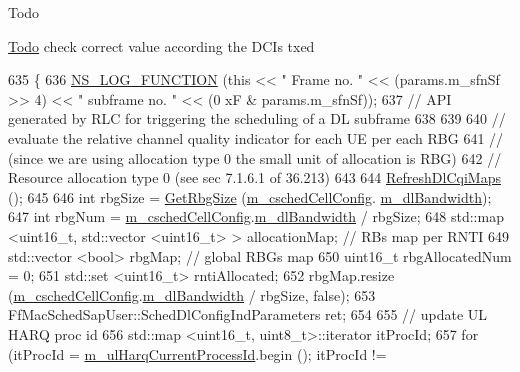 \begin{DoxyRefDesc}{Todo}
\item[\hyperlink{todo__todo000138}{Todo}]check correct value according the D\+C\+Is txed \end{DoxyRefDesc}

\begin{DoxyCode}
635 \{
636   \hyperlink{log-macros-disabled_8h_a90b90d5bad1f39cb1b64923ea94c0761}{NS\_LOG\_FUNCTION} (\textcolor{keyword}{this} << \textcolor{stringliteral}{" Frame no. "} << (params.m\_sfnSf >> 4) << \textcolor{stringliteral}{" subframe no. "} << (0
      xF & params.m\_sfnSf));
637   \textcolor{comment}{// API generated by RLC for triggering the scheduling of a DL subframe}
638 
639 
640   \textcolor{comment}{// evaluate the relative channel quality indicator for each UE per each RBG}
641   \textcolor{comment}{// (since we are using allocation type 0 the small unit of allocation is RBG)}
642   \textcolor{comment}{// Resource allocation type 0 (see sec 7.1.6.1 of 36.213)}
643 
644   \hyperlink{classns3_1_1TtaFfMacScheduler_a26eadc05cfa6ac456b5149467f0b92ec}{RefreshDlCqiMaps} ();
645 
646   \textcolor{keywordtype}{int} rbgSize = \hyperlink{classns3_1_1TtaFfMacScheduler_a496f93bd1b87f83996ba8358903ab69d}{GetRbgSize} (\hyperlink{classns3_1_1TtaFfMacScheduler_af263a06ea69ff1d096ddb48df0ac7f81}{m\_cschedCellConfig}.
      \hyperlink{structns3_1_1FfMacCschedSapProvider_1_1CschedCellConfigReqParameters_ad18c695bd3c9d7f742ba1dab4a941e8a}{m\_dlBandwidth});
647   \textcolor{keywordtype}{int} rbgNum = \hyperlink{classns3_1_1TtaFfMacScheduler_af263a06ea69ff1d096ddb48df0ac7f81}{m\_cschedCellConfig}.\hyperlink{structns3_1_1FfMacCschedSapProvider_1_1CschedCellConfigReqParameters_ad18c695bd3c9d7f742ba1dab4a941e8a}{m\_dlBandwidth} / rbgSize;
648   std::map <uint16\_t, std::vector <uint16\_t> > allocationMap; \textcolor{comment}{// RBs map per RNTI}
649   std::vector <bool> rbgMap;  \textcolor{comment}{// global RBGs map}
650   uint16\_t rbgAllocatedNum = 0;
651   std::set <uint16\_t> rntiAllocated;
652   rbgMap.resize (\hyperlink{classns3_1_1TtaFfMacScheduler_af263a06ea69ff1d096ddb48df0ac7f81}{m\_cschedCellConfig}.\hyperlink{structns3_1_1FfMacCschedSapProvider_1_1CschedCellConfigReqParameters_ad18c695bd3c9d7f742ba1dab4a941e8a}{m\_dlBandwidth} / rbgSize, \textcolor{keyword}{false});
653   FfMacSchedSapUser::SchedDlConfigIndParameters ret;
654 
655   \textcolor{comment}{//   update UL HARQ proc id}
656   std::map <uint16\_t, uint8\_t>::iterator itProcId;
657   \textcolor{keywordflow}{for} (itProcId = \hyperlink{classns3_1_1TtaFfMacScheduler_af8bd1675d63b73c0374a39180e1cbf54}{m\_ulHarqCurrentProcessId}.begin (); itProcId != 

\end{DoxyCode}
